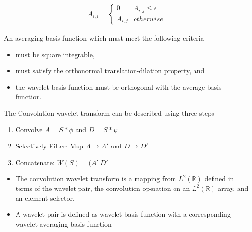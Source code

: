 \begin{eqnarray*}
A_{i,j} = \left\{\begin{array}{cc}0 & A_{i,j}\le \epsilon \\A_{i,j} & otherwise\end{array}\right.
\end{eqnarray*}
 

An averaging basis function which must meet the following criteria
\begin{itemize}
\item must be square integrable, 
\item must satisfy the orthonormal translation-dilation property, and
\item the wavelet basis function must be orthogonal with the average basis function.
\end{itemize}

The Convolution wavelet transform can be described using three steps
\begin{enumerate}
\item Convolve $A= S \ast \phi$ and $D = S \ast \psi$
\item Selectively Filter: Map $A\to A'$ and $D\to D'$
\item Concatenate:  $W(S) = (A'|D'$
\end{enumerate}

\begin{itemize}
\item The convolution wavelet transform is a mapping from $L^2({\mathbb R})$ defined in terms of the wavelet pair, the convolution operation on an $L^2({\mathbb R})$ array, and an element selector.
\item A wavelet pair is defined as wavelet basis function with a corresponding wavelet averaging basis function
\end{itemize}
